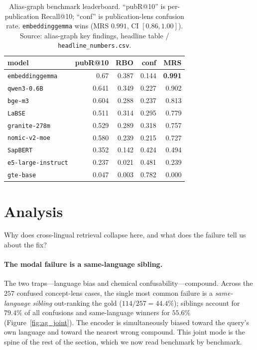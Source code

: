 \documentclass[11pt]{article}
\begin{document}
\begin{table}[t]
  \centering
  \small
  \begin{tabular}{lrrrr}
    \toprule
    model & pubR@10 & RBO & conf & MRS \\
    \midrule
    \texttt{embeddinggemma} & 0.67  & 0.387 & 0.144 & \textbf{0.991} \\
    \texttt{qwen3-0.6B}     & 0.641 & 0.349 & 0.227 & 0.902 \\
    \texttt{bge-m3}         & 0.604 & 0.288 & 0.237 & 0.813 \\
    \texttt{LaBSE}          & 0.511 & 0.314 & 0.295 & 0.779 \\
    \texttt{granite-278m}   & 0.529 & 0.289 & 0.318 & 0.757 \\
    \texttt{nomic-v2-moe}   & 0.580 & 0.239 & 0.215 & 0.727 \\
    \texttt{SapBERT}        & 0.352 & 0.142 & 0.424 & 0.494 \\
    \texttt{e5-large-instruct} & 0.237 & 0.021 & 0.481 & 0.239 \\
    \texttt{gte-base}       & 0.047 & 0.003 & 0.782 & 0.000 \\
    \bottomrule
  \end{tabular}
  \caption{Alias-graph benchmark leaderboard. ``pubR@10'' is per-publication
  Recall@10; ``conf'' is publication-lens confusion rate.
  \texttt{embeddinggemma} wins (MRS $0.991$, CI $[0.86,1.00]$).
  Source: alias-graph key findings, headline table / \texttt{headline\_numbers.csv}.}
  \label{tab:ag_board}
\end{table}


\section{Analysis}
\label{sec:analysis}

Why does cross-lingual retrieval collapse here, and what does the failure tell
us about the fix?

\paragraph{The modal failure is a same-language sibling.}
The two traps---language bias and chemical confusability---compound. Across the
$257$ confused concept-lens cases, the single most common failure is a
\emph{same-language sibling} out-ranking the gold ($114/257 = 44.4\%$); siblings
account for $79.4\%$ of all confusions and same-language winners for $55.6\%$
(Figure~\ref{fig:ag_joint}). The encoder is simultaneously biased toward the
query's own language and toward the nearest wrong compound. This joint mode is
the spine of the rest of the section, which we now read benchmark by benchmark.
\end{document}
